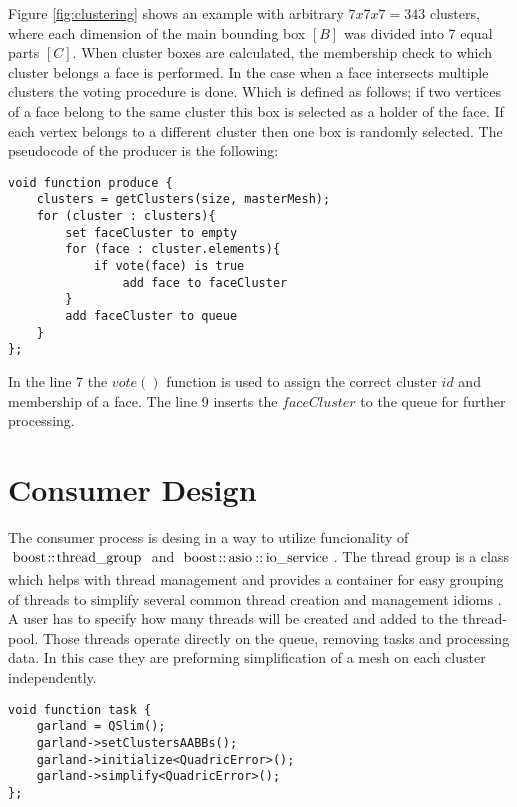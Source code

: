 Figure \ref{fig:clustering} shows an example with arbitrary $7x7x7=343$ clusters, where each dimension of the main bounding box $[B]$ was divided into 7 equal parts $[C]$. When cluster boxes are calculated, the membership check to which cluster belongs a face is performed. In the case when a face intersects multiple clusters the voting procedure is done. Which is defined as follows; if two vertices of a face belong to the same cluster this box is selected as a holder of the face. If each vertex belongs to a different cluster then one box is randomly selected. The pseudocode of the producer is the following:
\newline
\begin{center}
\begin{lstlisting}[caption={C style psuedocode of a producer},captionpos=b]
void function produce {
    clusters = getClusters(size, masterMesh);
    for (cluster : clusters){
        set faceCluster to empty
        for (face : cluster.elements){
            if vote(face) is true
                add face to faceCluster
        }
        add faceCluster to queue
    }
};
\end{lstlisting}
\end{center}

In the line 7 the $vote()$ function is used to assign the correct cluster $id$ and membership of a face. The line 9 inserts the $faceCluster$ to the queue for further processing.

\newpage
\section{Consumer Design}

The consumer process is desing in a way to utilize funcionality of $\inlinecode{Java}{boost::thread_group}$ and $\inlinecode{Java}{boost::asio::io_service}$. The thread group is a class which helps with thread management and provides a container for easy grouping of threads to simplify several common thread creation and management idioms \cite{boost03}. A user has to specify how many threads will be created and added to the thread-pool. Those threads operate directly on the queue, removing tasks and processing data. In this case they are preforming simplification of a mesh on each cluster independently.
\newline
\begin{center}
\begin{lstlisting}[caption={C style psuedocode of a task for a consumer},captionpos=b]
void function task {
    garland = QSlim();
    garland->setClustersAABBs();
    garland->initialize<QuadricError>();
    garland->simplify<QuadricError>();
};
\end{lstlisting}
\end{center}

